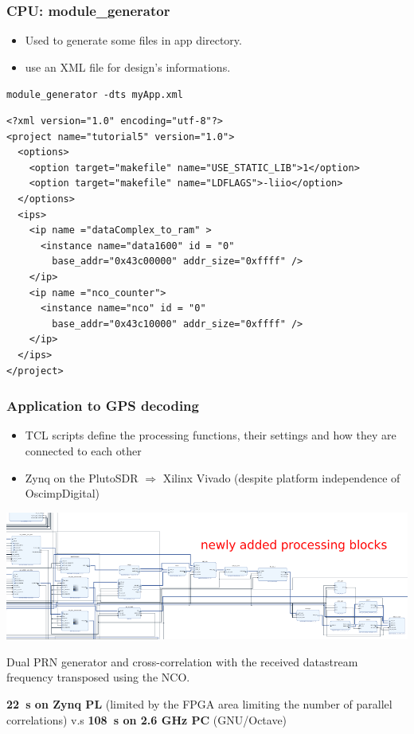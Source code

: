 \documentclass[compress,10pt]{beamer}
\begin{document}
\begin{frame}[containsverbatim]
\frametitle{CPU: module\_generator}
\begin{itemize}
\item Used to generate some files in app directory.
\item use an XML file for design's informations.
\end{itemize}

{\small \verb!module_generator -dts myApp.xml!}

\hspace{-0.6cm}
{\footnotesize \begin{verbatim}
<?xml version="1.0" encoding="utf-8"?>
<project name="tutorial5" version="1.0">
  <options>
    <option target="makefile" name="USE_STATIC_LIB">1</option>
    <option target="makefile" name="LDFLAGS">-liio</option>
  </options>
  <ips>
    <ip name ="dataComplex_to_ram" >
      <instance name="data1600" id = "0"
        base_addr="0x43c00000" addr_size="0xffff" />
    </ip>
    <ip name ="nco_counter">
      <instance name="nco" id = "0"
        base_addr="0x43c10000" addr_size="0xffff" />
    </ip>
  </ips>
</project>
\end{verbatim}
}
\end{frame}

\begin{frame}[fragile]\frametitle{Application to GPS decoding}

\begin{itemize}
\item
TCL scripts define the processing functions, their settings and how they are 
connected to each other
\item Zynq on the PlutoSDR $\Rightarrow$ Xilinx Vivado (despite platform
independence of OscimpDigital)
\end{itemize}

\begin{center}
\includegraphics[width=1.04\linewidth]{2xcorr_2PRN_NCO_crop.pdf}
{\footnotesize Dual PRN generator and cross-correlation with the received datastream frequency
transposed using the NCO.\par}
\end{center}

\vfill
{\bf 22~s on Zynq PL} (limited by the FPGA area limiting the number of parallel correlations) v.s {\bf 108~s on 2.6 GHz PC} (GNU/Octave)
\end{frame}
\end{document}
